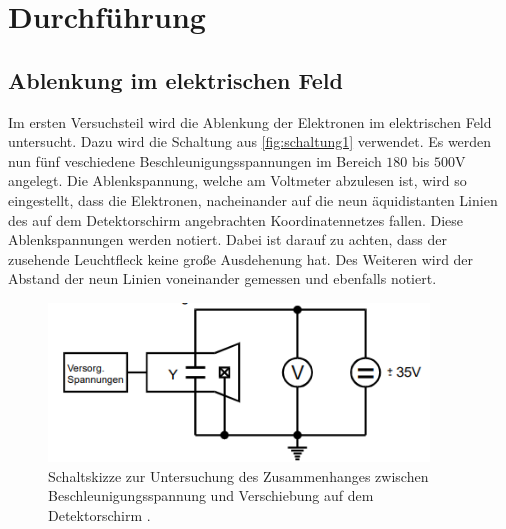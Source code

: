 \section{Durchführung}
\label{sec:Durchführung}
\subsection{Ablenkung im elektrischen Feld}
    Im ersten Versuchsteil wird die Ablenkung der Elektronen im elektrischen Feld untersucht. Dazu wird die Schaltung aus 
    \autoref{fig:schaltung1} verwendet. Es werden nun fünf veschiedene Beschleunigungsspannungen im Bereich $180$ bis $500$V
    angelegt. Die Ablenkspannung, welche am 
    Voltmeter abzulesen ist, wird so eingestellt, dass die Elektronen, nacheinander auf die neun äquidistanten Linien des auf dem 
    Detektorschirm angebrachten Koordinatennetzes fallen. Diese Ablenkspannungen werden notiert. Dabei ist darauf zu achten, dass der 
    zusehende Leuchtfleck keine große Ausdehenung hat. Des Weiteren wird der Abstand der neun Linien voneinander gemessen und ebenfalls notiert.
    \begin{figure}
        \centering
        \includegraphics[width=0.9\textwidth]{content/schaltung_ablenk.png}
        \caption{Schaltskizze zur Untersuchung des Zusammenhanges zwischen Beschleunigungsspannung und Verschiebung auf dem Detektorschirm \cite{V501-und-V502}.}
        \label{fig:schaltung1}
    \end{figure}


